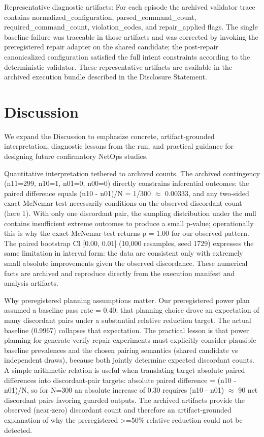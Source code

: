 \documentclass[conference]{IEEEtran}
\begin{document}
Representative diagnostic artifacts: For each episode the archived validator trace contains normalized\_configuration, parsed\_command\_count, required\_command\_count, violation\_codes, and repair\_applied flags. The single baseline failure was traceable in those artifacts and was corrected by invoking the preregistered repair adapter on the shared candidate; the post‑repair canonicalized configuration satisfied the full intent constraints according to the deterministic validator. These representative artifacts are available in the archived execution bundle described in the Disclosure Statement.

\section{Discussion}
We expand the Discussion to emphasize concrete, artifact‑grounded interpretation, diagnostic lessons from the run, and practical guidance for designing future confirmatory NetOps studies.

Quantitative interpretation tethered to archived counts. The archived contingency (n11=299, n10=1, n01=0, n00=0) directly constrains inferential outcomes: the paired difference equals (n10 - n01)/N = 1/300 \ensuremath{\approx} 0.00333, and any two‑sided exact McNemar test necessarily conditions on the observed discordant count (here 1). With only one discordant pair, the sampling distribution under the null contains insufficient extreme outcomes to produce a small p‑value; operationally this is why the exact McNemar test returns p = 1.00 for our observed pattern. The paired bootstrap CI [0.00, 0.01] (10,000 resamples, seed 1729) expresses the same limitation in interval form: the data are consistent only with extremely small absolute improvements given the observed discordance. These numerical facts are archived and reproduce directly from the execution manifest and analysis artifacts.

Why preregistered planning assumptions matter. Our preregistered power plan assumed a baseline pass rate = 0.40; that planning choice drove an expectation of many discordant pairs under a substantial relative reduction target. The actual baseline (0.9967) collapses that expectation. The practical lesson is that power planning for generate‑verify repair experiments must explicitly consider plausible baseline prevalences and the chosen pairing semantics (shared candidate vs independent draws), because both jointly determine expected discordant counts. A simple arithmetic relation is useful when translating target absolute paired differences into discordant‑pair targets: absolute paired difference = (n10 - n01)/N, so for N=300 an absolute increase of 0.30 requires (n10 - n01) \ensuremath{\approx} 90 net discordant pairs favoring guarded outputs. The archived artifacts provide the observed (near‑zero) discordant count and therefore an artifact‑grounded explanation of why the preregistered >=50\% relative reduction could not be detected.
\end{document}
